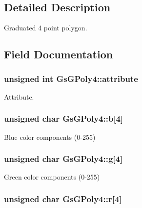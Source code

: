 \subsection{Detailed Description}
Graduated 4 point polygon. 

\subsection{Field Documentation}
\hypertarget{structGsGPoly4_af5e7a061fb2b0a57972442dcf2f78bce}{}
\subsubsection[{attribute}]{\setlength{\rightskip}{0pt plus 5cm}unsigned int Gs\+G\+Poly4\+::attribute}\label{structGsGPoly4_af5e7a061fb2b0a57972442dcf2f78bce}


Attribute. 

\hypertarget{structGsGPoly4_a35675523985a715e01f86b1f0dfe908c}{}
\subsubsection[{b}]{\setlength{\rightskip}{0pt plus 5cm}unsigned char Gs\+G\+Poly4\+::b\mbox{[}4\mbox{]}}\label{structGsGPoly4_a35675523985a715e01f86b1f0dfe908c}


Blue color components (0-\/255) 

\hypertarget{structGsGPoly4_abb1a69f0f5846b10c77ccc5cc61ae909}{}
\subsubsection[{g}]{\setlength{\rightskip}{0pt plus 5cm}unsigned char Gs\+G\+Poly4\+::g\mbox{[}4\mbox{]}}\label{structGsGPoly4_abb1a69f0f5846b10c77ccc5cc61ae909}


Green color components (0-\/255) 

\hypertarget{structGsGPoly4_ad1bcb72c4a381b75479a7d272078e7ce}{}
\subsubsection[{r}]{\setlength{\rightskip}{0pt plus 5cm}unsigned char Gs\+G\+Poly4\+::r\mbox{[}4\mbox{]}}\label{structGsGPoly4_ad1bcb72c4a381b75479a7d272078e7ce}


